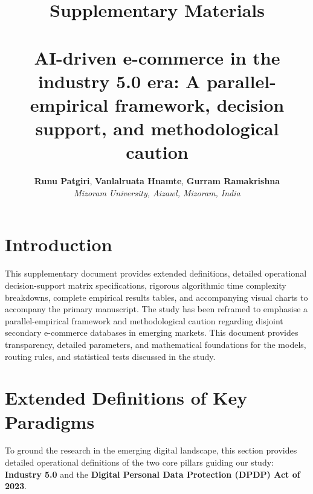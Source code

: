 \documentclass[11pt]{article}
\title{\textbf{Supplementary Materials\\~\\{AI}-driven e-commerce in the industry 5.0 era: A parallel-empirical framework, decision support, and methodological caution}}
\author{\textbf{Runu Patgiri}, \textbf{Vanlalruata Hnamte}, \textbf{Gurram Ramakrishna} \\
\textit{Mizoram University, Aizawl, Mizoram, India}}
\date{}
\begin{document}
\maketitle

\section{Introduction}
This supplementary document provides extended definitions, detailed operational decision-support matrix specifications, rigorous algorithmic time complexity breakdowns, complete empirical results tables, and accompanying visual charts to accompany the primary manuscript. The study has been reframed to emphasise a parallel-empirical framework and methodological caution regarding disjoint secondary e-commerce databases in emerging markets. This document provides transparency, detailed parameters, and mathematical foundations for the models, routing rules, and statistical tests discussed in the study.

\section{Extended Definitions of Key Paradigms}
To ground the research in the emerging digital landscape, this section provides detailed operational definitions of the two core pillars guiding our study: \textbf{Industry 5.0} and the \textbf{Digital Personal Data Protection (DPDP) Act of 2023}.
\end{document}
